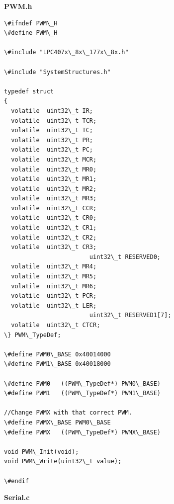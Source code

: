 \documentclass{article}
\begin{document}
\linebreak
\textbf{PWM.h}
\begin{lstlisting}
\#ifndef PWM\_H
\#define PWM\_H

\#include "LPC407x\_8x\_177x\_8x.h"

\#include "SystemStructures.h"

typedef struct
{
  volatile	uint32\_t IR;
  volatile	uint32\_t TCR;
  volatile	uint32\_t TC;
  volatile	uint32\_t PR;
  volatile	uint32\_t PC;
  volatile	uint32\_t MCR;
  volatile	uint32\_t MR0;
  volatile	uint32\_t MR1;
  volatile	uint32\_t MR2;
  volatile	uint32\_t MR3;
  volatile	uint32\_t CCR;
  volatile  uint32\_t CR0;
  volatile  uint32\_t CR1;
  volatile  uint32\_t CR2;
  volatile  uint32\_t CR3;
						uint32\_t RESERVED0;
  volatile	uint32\_t MR4;
  volatile	uint32\_t MR5;
  volatile	uint32\_t MR6;
  volatile	uint32\_t PCR;
  volatile	uint32\_t LER;
						uint32\_t RESERVED1[7];
  volatile	uint32\_t CTCR;
\} PWM\_TypeDef;

\#define PWM0\_BASE	0x40014000
\#define PWM1\_BASE	0x40018000

\#define PWM0	((PWM\_TypeDef*) PWM0\_BASE)
\#define PWM1	((PWM\_TypeDef*) PWM1\_BASE)

//Change PWMX with that correct PWM.
\#define PWMX\_BASE	PWM0\_BASE
\#define PWMX	((PWM\_TypeDef*) PWMX\_BASE)

void PWM\_Init(void);
void PWM\_Write(uint32\_t value);

\#endif
\end{lstlisting}
\linebreak
\textbf{Serial.c}
\end{document}
